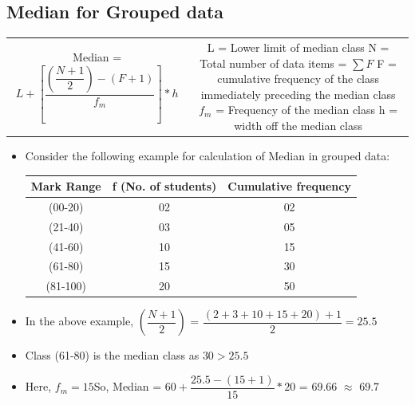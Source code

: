 \documentclass[8pt]{report}
\begin{document}
		\subsection{Median for Grouped data}
		\begin{table}[H]
			\centering
			\begin{tabular}{cc}
				\parbox{8cm}{Median = $\boxed{L + \left[\dfrac{\left(\dfrac{N+1}{2}\right)-(F+1)}{f_m}\right]*h}$} & \hspace{-1cm}
				\parbox{9cm}{L = Lower limit of median class\\\\N = Total number of data items = $\sum F$\\\\ F = cumulative frequency of the class immediately preceding the median class\\\\$f_m$ = Frequency of the median class\\\\h = width off the median class}
			\end{tabular}
		\end{table}\hrulefill
		\begin{itemize}
			\item Consider the following example for calculation of Median in grouped data:
			\begin{table}[H]
				\centering
				\def\arraystretch{1.5}
				\begin{tabular}{|c|c|c|}
				\hline
				\textbf{Mark Range} & \textbf{f (No. of students)} & \textbf{Cumulative frequency}\\
				\hline
				(00-20) & 02 & 02\\
				\hline
				(21-40) & 03	& 05\\
				\hline
				(41-60) & 10	& 15\\
				\hline
				(61-80) & 15	& 30\\
				\hline
				(81-100) & 20	& 50\\		
				\hline	
				\end{tabular}							
			\end{table}
			\item In the above example, $\left(\dfrac{N+1}{2}\right)$ = $\dfrac{(2+3+10+15+20)+1}{2} = 25.5$
			\item Class (61-80) is the median class as $30 > 25.5$
			\item Here,    $\boxed{f_m=15}$\hspace{1cm}So, Median = $60 + \dfrac{25.5-(15+1)}{15} * 20$ = 69.66 $\approx$ 69.7
		\end{itemize}\hrulefill
\end{document}

